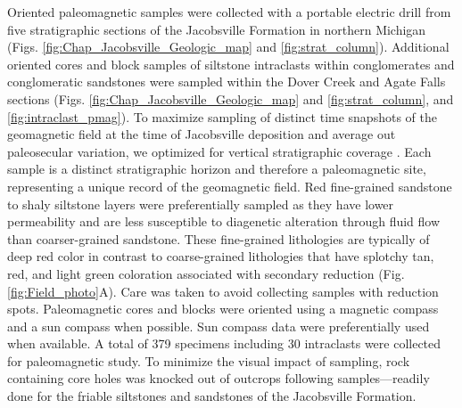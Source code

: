 Oriented paleomagnetic samples were collected with a portable electric drill from five stratigraphic sections of the Jacobsville Formation in northern Michigan (Figs. \ref{fig:Chap_Jacobsville_Geologic_map} and \ref{fig:strat_column}). Additional oriented cores and block samples of siltstone intraclasts within conglomerates and conglomeratic sandstones were sampled within the Dover Creek and Agate Falls sections (Figs. \ref{fig:Chap_Jacobsville_Geologic_map} and \ref{fig:strat_column}, and \ref{fig:intraclast_pmag}). To maximize sampling of distinct time snapshots of the geomagnetic field at the time of Jacobsville deposition and average out paleosecular variation, we optimized for vertical stratigraphic coverage \citep{Sapienza2023a}. Each sample is a distinct stratigraphic horizon and therefore a paleomagnetic site, representing a unique record of the geomagnetic field. Red fine-grained sandstone to shaly siltstone layers were preferentially sampled as they have lower permeability and are less susceptible to diagenetic alteration through fluid flow than coarser-grained sandstone. These fine-grained lithologies are typically of deep red color in contrast to coarse-grained lithologies that have splotchy tan, red, and light green coloration associated with secondary reduction (Fig. \ref{fig:Field_photo}A). Care was taken to avoid collecting samples with reduction spots. Paleomagnetic cores and blocks were oriented using a magnetic compass and a sun compass when possible. Sun compass data were preferentially used when available. A total of 379 specimens including 30 intraclasts were collected for paleomagnetic study. To minimize the visual impact of sampling, rock containing core holes was knocked out of outcrops following samples---readily done for the friable siltstones and sandstones of the Jacobsville Formation.

